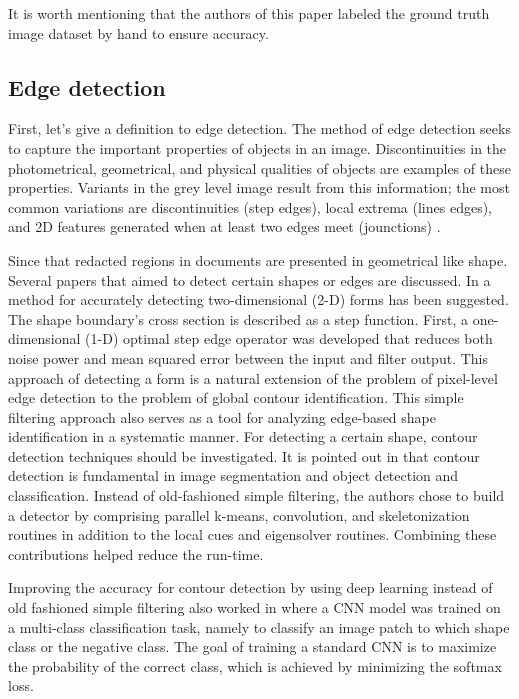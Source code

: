 \documentclass[sigconf,authordraft]{acmart}
\begin{document}
It is worth mentioning that the authors of this paper \cite{how} labeled the ground truth image dataset by hand to ensure accuracy.      
\subsection{Edge detection}
First, let's give a definition to edge detection. The method of edge detection seeks to capture the important properties of objects in an image. Discontinuities in the photometrical, geometrical, and physical qualities of objects are examples of these properties. Variants in the grey level image result from this information; the most common variations are discontinuities (step edges), local extrema (lines edges), and 2D features generated when at least two edges meet (jounctions) \cite{ww}.

Since that redacted regions in documents are presented in geometrical like shape. Several papers that aimed to detect certain shapes or edges are discussed. In \cite{edgeBased} a method for accurately detecting two-dimensional (2-D) forms has been suggested. The shape boundary's cross section is described as a step function. First, a one-dimensional (1-D) optimal step edge operator was developed that reduces both noise power and mean squared error between the input and filter output.
This approach of detecting a form is a natural extension of the problem of pixel-level edge detection to the problem of global contour identification. This simple filtering approach also serves as a tool for analyzing edge-based shape identification in a systematic manner. For detecting a certain shape, contour detection techniques should be investigated. It is pointed out in \cite{hqi} that contour detection is fundamental in image segmentation and object detection and classification. Instead of old-fashioned simple filtering, the authors chose to build a detector by comprising parallel k-means, convolution, and skeletonization routines in addition to the local cues and eigensolver routines. Combining these contributions helped reduce the run-time.

Improving the accuracy for contour detection by using deep learning instead of old fashioned simple filtering also worked in \cite{deepCon} where a CNN model was trained on a multi-class classification task, namely to classify an image patch to which shape class or the negative class. The goal of training a standard CNN is to maximize the
probability of the correct class, which is achieved by minimizing the softmax loss.
\end{document}
